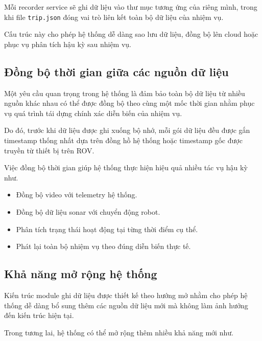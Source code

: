\documentclass[../DoAn.tex]{subfiles}
\begin{document}
Mỗi recorder service sẽ ghi dữ liệu vào thư mục tương ứng của riêng mình, trong khi file \texttt{trip.json} đóng vai trò liên kết toàn bộ dữ liệu của nhiệm vụ.

Cấu trúc này cho phép hệ thống dễ dàng sao lưu dữ liệu, đồng bộ lên cloud hoặc phục vụ phân tích hậu kỳ sau nhiệm vụ.

\subsection{Đồng bộ thời gian giữa các nguồn dữ liệu}

Một yêu cầu quan trọng trong hệ thống là đảm bảo toàn bộ dữ liệu từ nhiều nguồn khác nhau có thể được đồng bộ theo cùng một mốc thời gian nhằm phục vụ quá trình tái dựng chính xác diễn biến của nhiệm vụ.

Do đó, trước khi dữ liệu được ghi xuống bộ nhớ, mỗi gói dữ liệu đều được gắn timestamp thống nhất dựa trên đồng hồ hệ thống hoặc timestamp gốc được truyền từ thiết bị trên ROV.

Việc đồng bộ thời gian giúp hệ thống thực hiện hiệu quả nhiều tác vụ hậu kỳ như.

\begin{itemize}

    \item Đồng bộ video với telemetry hệ thống.
    
    \item Đồng bộ dữ liệu sonar với chuyển động robot.
    
    \item Phân tích trạng thái hoạt động tại từng thời điểm cụ thể.
    
    \item Phát lại toàn bộ nhiệm vụ theo đúng diễn biến thực tế.

\end{itemize}

\subsection{Khả năng mở rộng hệ thống}

Kiến trúc module ghi dữ liệu được thiết kế theo hướng mở nhằm cho phép hệ thống dễ dàng bổ sung thêm các nguồn dữ liệu mới mà không làm ảnh hưởng đến kiến trúc hiện tại.

Trong tương lai, hệ thống có thể mở rộng thêm nhiều khả năng mới như.
\end{document}
